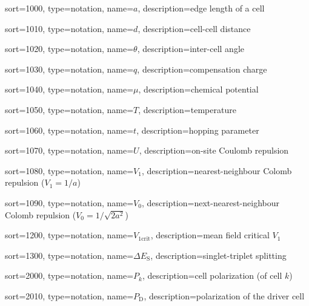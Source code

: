 {
  sort=1000,
  type=notation,
  name={\ensuremath{a}},
  description={edge length of a cell}
}

{
  sort=1010,
  type=notation,
  name={\ensuremath{d}},
  description={cell-cell distance}
}

{
  sort=1020,
  type=notation,
  name={\ensuremath{\theta}},
  description={inter-cell angle}
}

{
  sort=1030,
  type=notation,
  name={\ensuremath{q}},
  description={compensation charge}
}

{
  sort=1040,
  type=notation,
  name={\ensuremath{\mu}},
  description={chemical potential}
}

{
  sort=1050,
  type=notation,
  name={\ensuremath{T}},
  description={temperature}
}

{
  sort=1060,
  type=notation,
  name={\ensuremath{t}},
  description={hopping parameter}
}

{
  sort=1070,
  type=notation,
  name={\ensuremath{U}},
  description={on-site Coulomb repulsion}
}

{
  sort=1080,
  type=notation,
  name={\ensuremath{V_1}},
  description={nearest-neighbour Colomb repulsion ($V_1 = 1/a$)}
}

{
  sort=1090,
  type=notation,
  name={\ensuremath{V_0}},
  description={next-nearest-neighbour Colomb repulsion ($V_0 = 1/\sqrt{2a^2}$)}
}


{
  sort=1200,
  type=notation,
  name={\ensuremath{V_{1\mathrm{crit}}}},
  description={mean field critical $V_1$}
}

{
  sort=1300,
  type=notation,
  name={\ensuremath{\Delta E_\text{S}}},
  description={singlet-triplet splitting}
}

{
  sort=2000,
  type=notation,
  name={\ensuremath{P_k}},
  description={cell polarization (of cell $k$)}
}

{
  sort=2010,
  type=notation,
  name={\ensuremath{P_\text{D}}},
  description={polarization of the driver cell}
}

